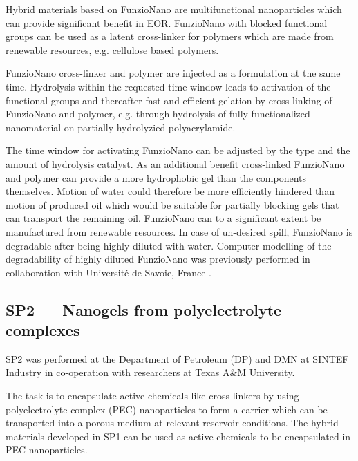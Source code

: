 Hybrid materials  based on FunzioNano are multifunctional nanoparticles which can provide significant benefit in EOR. FunzioNano with blocked functional groups can be used as a latent cross-linker for polymers which are made from renewable resources, e.g. cellulose based polymers. 

FunzioNano cross-linker and polymer are injected as a formulation at the same time. Hydrolysis within the requested time window leads to activation of the functional groups and thereafter fast and efficient gelation by cross-linking  of FunzioNano and polymer, e.g. through hydrolysis  of fully functionalized nanomaterial on partially hydrolyzied polyacrylamide. 

The time window  for activating FunzioNano can be adjusted by the type and the amount of hydrolysis catalyst. As an additional benefit cross-linked FunzioNano and polymer can provide a more hydrophobic gel than the components themselves. Motion of water could therefore be more efficiently hindered than motion of produced oil which would be suitable for partially blocking gels that can transport the remaining oil. FunzioNano can to a significant extent be manufactured from renewable resources. In case of un-desired spill, FunzioNano is degradable  after being highly diluted with water. Computer modelling of the degradability of highly diluted FunzioNano was previously performed in collaboration with Université de Savoie, France \citep{Neyertz2012,Neyertz2013}.

\subsection*{SP2 --- Nanogels from polyelectrolyte complexes}

SP2 was performed at the Department of Petroleum (DP) and DMN at SINTEF Industry in co-operation with researchers at Texas A\&M University.

The task is to encapsulate active chemicals like cross-linkers by using polyelectrolyte complex  (PEC) nanoparticles to form a carrier which can be transported into a porous medium at relevant reservoir conditions. The hybrid materials developed in SP1 can be used as active chemicals to be encapsulated in PEC nanoparticles. 

